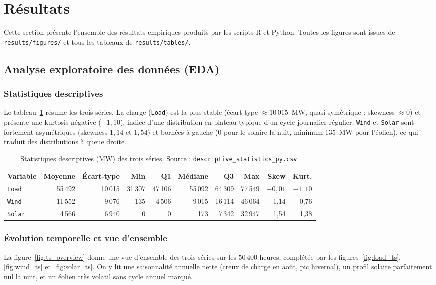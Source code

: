 \section{Résultats}
\label{sec:resultats}

Cette section présente l'ensemble des résultats empiriques produits par les
scripts R et Python. Toutes les figures sont issues de
\texttt{results/figures/} et tous les tableaux de \texttt{results/tables/}.

\subsection{Analyse exploratoire des données (EDA)}

\subsubsection{Statistiques descriptives}
Le tableau~\ref{tab:desc} résume les trois séries. La charge (\texttt{Load})
est la plus stable (écart-type \(\approx 10\,015\)~MW, quasi-symétrique :
skewness \(\approx 0\)) et présente une kurtosis négative (\(-1{,}10\)),
indice d'une distribution en plateau typique d'un cycle journalier
régulier. \texttt{Wind} et \texttt{Solar} sont fortement asymétriques
(skewness \(1{,}14\) et \(1{,}54\)) et bornées à gauche (\(0\) pour le solaire
la nuit, minimum \(135\)~MW pour l'éolien), ce qui traduit des distributions à
queue droite.

\begin{table}[H]
\centering
\caption{Statistiques descriptives (MW) des trois séries.
Source : \texttt{descriptive\_statistics\_py.csv}.}
\label{tab:desc}
\small
\begin{tabular}{lrrrrrrrrr}
\toprule
Variable & Moyenne & Écart-type & Min & Q1 & Médiane & Q3 & Max & Skew & Kurt. \\
\midrule
\texttt{Load}  & 55\,492 & 10\,015 & 31\,307 & 47\,106 & 55\,092 & 64\,309 & 77\,549 & $-0{,}01$ & $-1{,}10$ \\
\texttt{Wind}  & 11\,552 & 9\,076 & 135 & 4\,506 & 9\,015 & 16\,114 & 46\,064 & 1{,}14 & 0{,}76 \\
\texttt{Solar} & 4\,566 & 6\,940 & 0 & 0 & 173 & 7\,342 & 32\,947 & 1{,}54 & 1{,}38 \\
\bottomrule
\end{tabular}
\end{table}

\subsubsection{Évolution temporelle et vue d'ensemble}
La figure~\ref{fig:ts_overview} donne une vue d'ensemble des trois séries sur
les \(50\,400\) heures, complétée par les figures~\ref{fig:load_ts},
\ref{fig:wind_ts} et~\ref{fig:solar_ts}. On y lit une saisonnalité annuelle
nette (creux de charge en août, pic hivernal), un profil solaire
parfaitement nul la nuit, et un éolien très volatil sans cycle annuel marqué.

